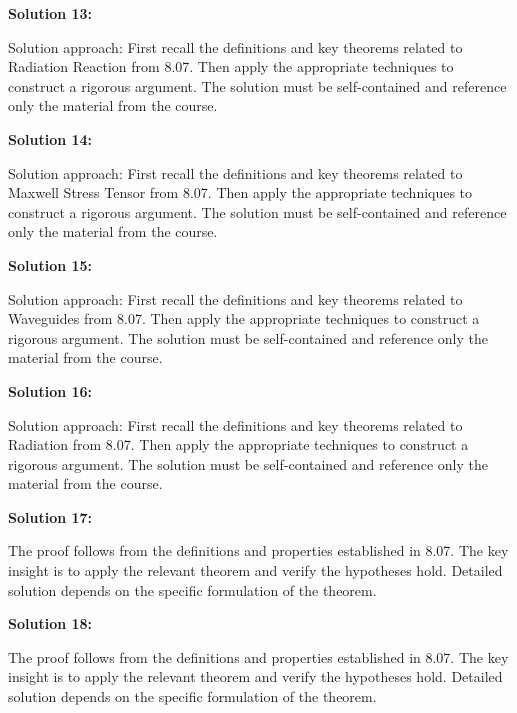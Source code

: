 \documentclass[12pt,a4paper]{exam}
\begin{document}
\vspace{0.5cm}

\textbf{Solution 13:}

Solution approach: First recall the definitions and key theorems related to Radiation Reaction from 8.07. Then apply the appropriate techniques to construct a rigorous argument. The solution must be self-contained and reference only the material from the course.

\vspace{0.5cm}

\textbf{Solution 14:}

Solution approach: First recall the definitions and key theorems related to Maxwell Stress Tensor from 8.07. Then apply the appropriate techniques to construct a rigorous argument. The solution must be self-contained and reference only the material from the course.

\vspace{0.5cm}

\textbf{Solution 15:}

Solution approach: First recall the definitions and key theorems related to Waveguides from 8.07. Then apply the appropriate techniques to construct a rigorous argument. The solution must be self-contained and reference only the material from the course.

\vspace{0.5cm}

\textbf{Solution 16:}

Solution approach: First recall the definitions and key theorems related to Radiation from 8.07. Then apply the appropriate techniques to construct a rigorous argument. The solution must be self-contained and reference only the material from the course.

\vspace{0.5cm}

\textbf{Solution 17:}

The proof follows from the definitions and properties established in 8.07. The key insight is to apply the relevant theorem and verify the hypotheses hold. Detailed solution depends on the specific formulation of the theorem.

\vspace{0.5cm}

\textbf{Solution 18:}

The proof follows from the definitions and properties established in 8.07. The key insight is to apply the relevant theorem and verify the hypotheses hold. Detailed solution depends on the specific formulation of the theorem.
\end{document}
